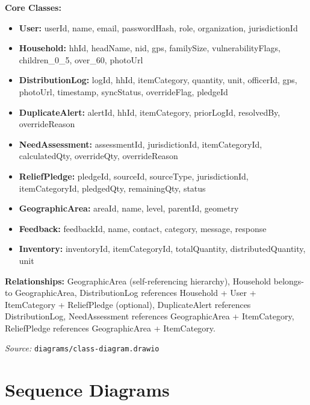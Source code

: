 \textbf{Core Classes:}
\begin{itemize}[nosep]
    \item \textbf{User:} userId, name, email, passwordHash, role, organization, jurisdictionId
    \item \textbf{Household:} hhId, headName, nid, gps, familySize, vulnerabilityFlags, children\_0\_5, over\_60, photoUrl
    \item \textbf{DistributionLog:} logId, hhId, itemCategory, quantity, unit, officerId, gps, photoUrl, timestamp, syncStatus, overrideFlag, pledgeId
    \item \textbf{DuplicateAlert:} alertId, hhId, itemCategory, priorLogId, resolvedBy, overrideReason
    \item \textbf{NeedAssessment:} assessmentId, jurisdictionId, itemCategoryId, calculatedQty, overrideQty, overrideReason
    \item \textbf{ReliefPledge:} pledgeId, sourceId, sourceType, jurisdictionId, itemCategoryId, pledgedQty, remainingQty, status
    \item \textbf{GeographicArea:} areaId, name, level, parentId, geometry
    \item \textbf{Feedback:} feedbackId, name, contact, category, message, response
    \item \textbf{Inventory:} inventoryId, itemCategoryId, totalQuantity, distributedQuantity, unit
\end{itemize}

\textbf{Relationships:} GeographicArea (self-referencing hierarchy), Household belongs-to GeographicArea, DistributionLog references Household + User + ItemCategory + ReliefPledge (optional), DuplicateAlert references DistributionLog, NeedAssessment references GeographicArea + ItemCategory, ReliefPledge references GeographicArea + ItemCategory.

\noindent\textit{Source:} \texttt{diagrams/class-diagram.drawio}

\section{Sequence Diagrams}

